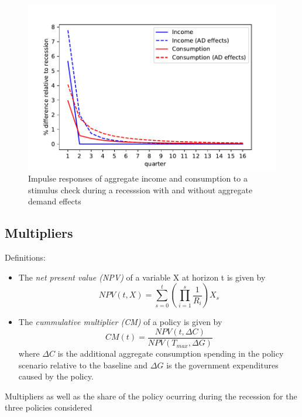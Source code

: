 \documentclass[../HAFiscal]{subfiles}
\begin{document}
\begin{figure}
	\centering
	\includegraphics[width=0.8\linewidth]{Code/HA-Models/FromPandemicCode/Figures/recession_Check_relrecession}
	\caption{Impulse responses of aggregate income and consumption to a stimulus check during a recesssion with and without aggregate demand effects}
	\label{fig:recessioncheckrelrecession}
\end{figure}

\FloatBarrier
\subsection{Multipliers}

Definitions:
\begin{itemize}
	\item The \textit{net present value (NPV)} of a variable X at horizon t is given by
	\begin{equation}
	NPV(t,X) = \sum_{s=0}^{t} \left( \prod_{i=1}^{s} \frac{1}{R_i} \right) X_s
	\end{equation}
	\item The \textit{cummulative multiplier (CM)} of a policy is given by
	\begin{equation}
	CM(t) = \frac{NPV(t,\Delta C)}{NPV (T_{max},\Delta G)}
	\end{equation}
	where $\Delta C$ is the additional aggregate consumption spending in the policy scenario relative to the baseline and $\Delta G$ is the government expenditures caused by the policy.
\end{itemize}

\begin{table} 
	\center
	
	\caption{Multipliers as well as the share of the policy ocurring during the recession for the three policies considered}
	\label{tab:Multiplier}
\end{table}
\end{document}
